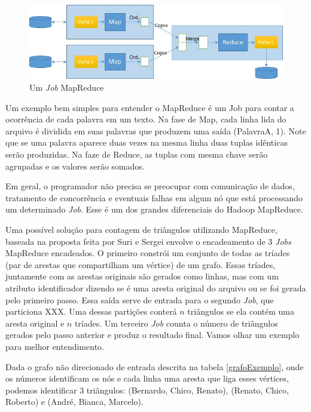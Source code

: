 \begin{figure}
	\centering
	\includegraphics[width=\linewidth]{./Job_Mapreduce.jpg}
	\caption{Um \textit{Job} MapReduce}
	\label{fig:mapreduce}
\end{figure}

Um exemplo bem simples para entender o MapReduce é um Job para contar a ocorrência de cada palavra em um texto. Na fase de Map, cada linha lida do arquivo é dividida em suas palavras que produzem uma saída (PalavraA, 1). Note que se uma palavra aparece duas vezes na mesma linha duas tuplas idênticas serão produzidas. Na faze de Reduce, as tuplas com mesma chave serão agrupadas e os valores serão somados. 

Em geral, o programador não precisa se preocupar com comunicação de dados, tratamento de concorrência e eventuais falhas em algum nó que está processando um determinado \textit{Job}. Esse é um dos grandes diferenciais do Hadoop MapReduce. 

Uma possível solução para contagem de triângulos utilizando MapReduce, baseada na proposta feita por Suri e Sergei \cite{suri2011counting} envolve o encadeamento de 3 \textit{Jobs} MapReduce encadeados. O primeiro constrói um conjunto de todas as tríades (par de arestas que compartilham um vértice) de um grafo. Essas tríades, juntamente com as arestas originais são gerados como linhas, mas com um atributo identificador dizendo se é uma aresta original do arquivo ou se foi gerada pelo primeiro passo. Essa saída serve de entrada para o segundo \textit{Job}, que particiona XXX. Uma dessas partições conterá $n$ triângulos se ela contém uma aresta original e $n$ tríades. Um terceiro \textit{Job} counta o número de triângulos gerados pelo passo anterior e produz o resultado final. Vamos olhar um exemplo para melhor entendimento.

Dada o grafo não direcionado de entrada descrita na tabela \ref{grafoExemplo}, onde os números identificam os nós e cada linha uma aresta que liga esses vértices, podemos identificar 3 triângulos: (Bernardo, Chico, Renato), (Renato, Chico, Roberto) e (André, Bianca, Marcelo).

